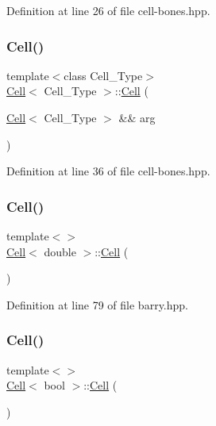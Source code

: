 Definition at line 26 of file cell-\/bones.\+hpp.

\mbox{\label{class_cell_abe27b0c411864d9fce33a1cffe918169}} 
\subsubsection{\texorpdfstring{Cell()}{Cell()}\hspace{0.1cm}{\footnotesize\ttfamily [5/9]}}
{\footnotesize\ttfamily template$<$class Cell\+\_\+\+Type$>$ \\
\hyperlink{class_cell}{Cell}$<$ Cell\+\_\+\+Type $>$\+::\hyperlink{class_cell}{Cell} (\begin{DoxyParamCaption}\item[{\hyperlink{class_cell}{Cell}$<$ Cell\+\_\+\+Type $>$ \&\&}]{arg }\end{DoxyParamCaption})\hspace{0.3cm}{\ttfamily [inline]}}



Definition at line 36 of file cell-\/bones.\+hpp.

\mbox{\label{class_cell_a5ecdaddaf4661a9a8fe6f0ed61595847}} 
\subsubsection{\texorpdfstring{Cell()}{Cell()}\hspace{0.1cm}{\footnotesize\ttfamily [6/9]}}
{\footnotesize\ttfamily template$<$$>$ \\
\hyperlink{class_cell}{Cell}$<$ double $>$\+::\hyperlink{class_cell}{Cell} (\begin{DoxyParamCaption}{ }\end{DoxyParamCaption})\hspace{0.3cm}{\ttfamily [inline]}}



Definition at line 79 of file barry.\+hpp.

\mbox{\label{class_cell_aef4b64101b33e2349ceea132b962d137}} 
\subsubsection{\texorpdfstring{Cell()}{Cell()}\hspace{0.1cm}{\footnotesize\ttfamily [7/9]}}
{\footnotesize\ttfamily template$<$$>$ \\
\hyperlink{class_cell}{Cell}$<$ bool $>$\+::\hyperlink{class_cell}{Cell} (\begin{DoxyParamCaption}{ }\end{DoxyParamCaption})\hspace{0.3cm}{\ttfamily [inline]}}



